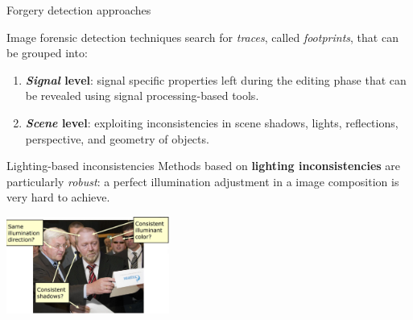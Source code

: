 \begin{tframe}{Forgery detection approaches}

\vspace{0.2cm}
Image forensic detection techniques search for \textit{traces}, called \emph{footprints}, that can be grouped into:
\vspace{0.3cm}
\begin{enumerate}
\item<1-> \textbf{\textit{Signal} level}: signal specific properties left during the editing phase that can be revealed using signal processing-based tools.
\vspace{0.3cm}
\item<2-> \textbf{\textit{Scene} level}: exploiting inconsistencies in scene shadows, lights, reflections, perspective, and geometry of objects.
\end{enumerate}
\vspace{0.3cm}
\end{tframe}


\begin{tframe}{Lighting-based inconsistencies}
Methods based on \textbf{lighting inconsistencies} are particularly \emph{robust}: a perfect illumination adjustment in a image composition is very hard to achieve.
\begin{center}
\includegraphics[width=0.4\textwidth]{images/lighting-based.jpg}
\end{center}
\vspace{0.3cm}
\end{tframe}


